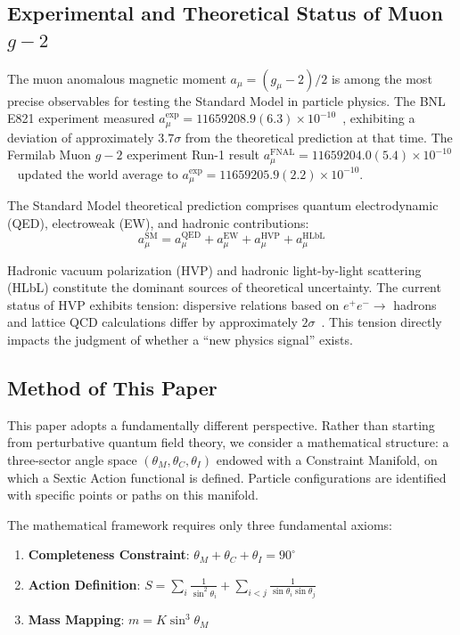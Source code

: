 \documentclass[aps,prd,reprint,nofootinbib]{revtex4-2}
\begin{document}
\subsection{Experimental and Theoretical Status of Muon $g-2$}

The muon anomalous magnetic moment $a_\mu = (g_\mu - 2)/2$ is among the most precise observables for testing the Standard Model in particle physics. The BNL E821 experiment measured $a_\mu^{\text{exp}} = 11659208.9(6.3) \times 10^{-10}$~\cite{Bennett2006}, exhibiting a deviation of approximately $3.7\sigma$ from the theoretical prediction at that time. The Fermilab Muon $g-2$ experiment Run-1 result $a_\mu^{\text{FNAL}} = 11659204.0(5.4) \times 10^{-10}$~\cite{Abi2021,Aguillard2023} updated the world average to $a_\mu^{\text{exp}} = 11659205.9(2.2) \times 10^{-10}$.

The Standard Model theoretical prediction comprises quantum electrodynamic (QED), electroweak (EW), and hadronic contributions:
\begin{equation}
a_\mu^{\text{SM}} = a_\mu^{\text{QED}} + a_\mu^{\text{EW}} + a_\mu^{\text{HVP}} + a_\mu^{\text{HLbL}}
\end{equation}

Hadronic vacuum polarization (HVP) and hadronic light-by-light scattering (HLbL) constitute the dominant sources of theoretical uncertainty. The current status of HVP exhibits tension: dispersive relations based on $e^+e^- \to$ hadrons and lattice QCD calculations differ by approximately $2\sigma$~\cite{Aoyama2020,Borsanyi2021,Davier2020}. This tension directly impacts the judgment of whether a ``new physics signal'' exists.

\subsection{Method of This Paper}

This paper adopts a fundamentally different perspective. Rather than starting from perturbative quantum field theory, we consider a mathematical structure: a three-sector angle space $(\theta_M, \theta_C, \theta_I)$ endowed with a Constraint Manifold, on which a Sextic Action functional is defined. Particle configurations are identified with specific points or paths on this manifold.

The mathematical framework requires only three fundamental axioms:
\begin{enumerate}
\item \textbf{Completeness Constraint}: $\theta_M + \theta_C + \theta_I = 90^\circ$
\item \textbf{Action Definition}: $S = \sum_i \frac{1}{\sin^2\theta_i} + \sum_{i<j} \frac{1}{\sin\theta_i\sin\theta_j}$
\item \textbf{Mass Mapping}: $m = K\sin^3\theta_M$
\end{enumerate}
\end{document}
